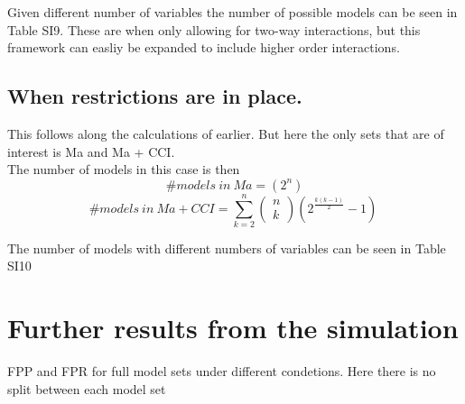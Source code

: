Given different number of variables the number of possible models can be seen in Table SI9. These are when only allowing for two-way interactions, but this framework can easliy be expanded to include higher order interactions. \\




\subsection{When restrictions are in place.}
This follows along the calculations of earlier. But here the only sets that are of interest is Ma and Ma + CCI.\\
The number of models in this case is then \\

\[\#models\ in\ Ma=\left(2^n\right)\] 
\[\#models\ in\ Ma+CCI=\sum^n_{k=2}{\left( \begin{array}{c}
n \\ 
k \end{array}
\right)}\left(2^{\frac{k\left(k-1\right)}{2}}-1\right)\ \]  

The number of models with different numbers of variables can be seen in Table SI10



\section{Further results from the simulation}
FPP and FPR for full model sets under different condetions. Here there is no split between each model set





